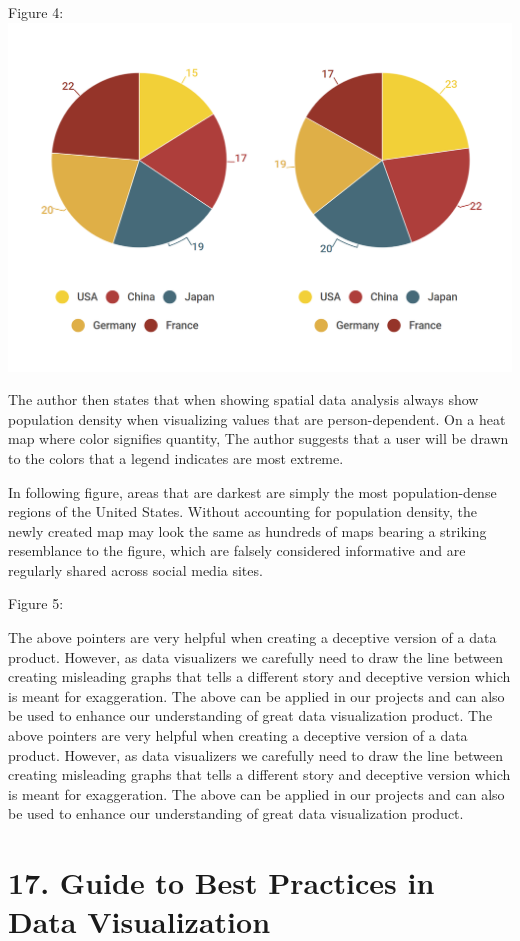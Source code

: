 \documentclass[]{book}
\theoremstyle{definition}
\theoremstyle{definition}
\theoremstyle{definition}
\theoremstyle{remark}
\begin{document}
Figure 4: \includegraphics{images/PieCharts.png}

The author then states that when showing spatial data analysis always
show population density when visualizing values that are
person-dependent. On a heat map where color signifies quantity, The
author suggests that a user will be drawn to the colors that a legend
indicates are most extreme.

In following figure, areas that are darkest are simply the most
population-dense regions of the United States. Without accounting for
population density, the newly created map may look the same as hundreds
of maps bearing a striking resemblance to the figure, which are falsely
considered informative and are regularly shared across social media
sites.

Figure 5:

The above pointers are very helpful when creating a deceptive version of
a data product. However, as data visualizers we carefully need to draw
the line between creating misleading graphs that tells a different story
and deceptive version which is meant for exaggeration. The above can be
applied in our projects and can also be used to enhance our
understanding of great data visualization product. The above pointers
are very helpful when creating a deceptive version of a data product.
However, as data visualizers we carefully need to draw the line between
creating misleading graphs that tells a different story and deceptive
version which is meant for exaggeration. The above can be applied in our
projects and can also be used to enhance our understanding of great data
visualization product.

\section{17. Guide to Best Practices in Data
Visualization}\label{guide-to-best-practices-in-data-visualization-1}
\end{document}
